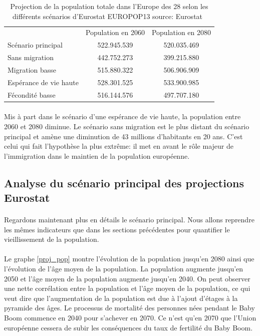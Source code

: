 \begin{table}
  \caption{Projection de la population totale dans l'Europe des 28 selon les différents scénarios d'Eurostat EUROPOP13 source: Eurostat~\citep{eurostat_europop13}}
  \label{projection_scenario}

  \begin{center}
    \begin{tabular}{lcc}
       & Population en 2060 & Population en 2080\\
      Scénario principal & 522.945.539 & 520.035.469\\
      Sans migration & 442.752.273 & 399.215.880 \\
      Migration basse & 515.880.322 & 506.906.909 \\
      Espérance de vie haute & 528.301.525 & 533.900.985 \\
      Fécondité basse & 516.144.576 & 497.707.180 \\
    \end{tabular}
  \end{center}
\end{table}

\paragraph{}Mis à part dans le scénario d’une espérance de vie haute, la population entre 2060 et 2080 diminue. Le scénario sans migration est le plus distant du scénario principal et amène une diminution de 43 millions d’habitants en 20 ans. C’est celui qui fait l’hypothèse la plus extrême: il met en avant le rôle majeur de l’immigration dans le maintien de la population européenne.


\subsection{Analyse du scénario principal des projections Eurostat}
\paragraph{}Regardons maintenant plus en détails le scénario principal. Nous allons reprendre les mêmes indicateurs que dans les sections précédentes pour quantifier le vieillissement de la population. 

\paragraph{}Le graphe \ref{proj_pop} montre l’évolution de la population jusqu’en 2080 ainsi que l’évolution de l’âge moyen de la population. La population augmente jusqu’en 2050 et l’âge moyen de la population augmente jusqu’en 2040. On peut observer une nette corrélation entre la population et l’âge moyen de la population, ce qui veut dire que l’augmentation de la population est due à l’ajout d’étages à la pyramide des âges. Le processus de mortalité des personnes nées pendant le Baby Boom commence en 2040 pour s’achever en 2070. Ce n’est qu’en 2070 que l’Union européenne cessera de subir les conséquences du taux de fertilité du Baby Boom. 


